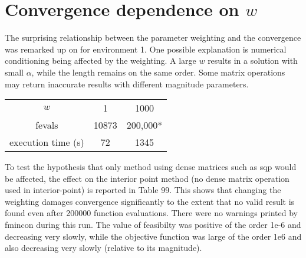 \section{Convergence dependence on $w$}
The surprising relationship between the parameter weighting and the convergence was remarked up on for environment 1. One possible explanation is numerical conditioning being affected by the weighting. A large $w$ results in a solution with small $\alpha$, while the length remains on the same order. Some matrix operations may return inaccurate results with different magnitude parameters.
\begin{center}
	\begin{tabular}{ |c|c|c| }
		 $w$ & 1 & 1000 \\ 
		 fevals & 10873 & 200,000* \\  
		 execution time (s)& 72 & 1345    
	\end{tabular}
\end{center}
To test the hypothesis that only method using dense matrices such as sqp would be affected, the effect on the interior point method (no dense matrix operation used in interior-point) is reported in Table 99. This shows that changing the weighting damages convergence significantly to the extent that no valid result is found even after 200000 function evaluations. There were no warnings printed by fmincon during this run. The value of feasibilty was positive of the order 1e-6 and decreasing very slowly, while the objective function was large of the order 1e6 and also decreasing very slowly (relative to its magnitude).     


